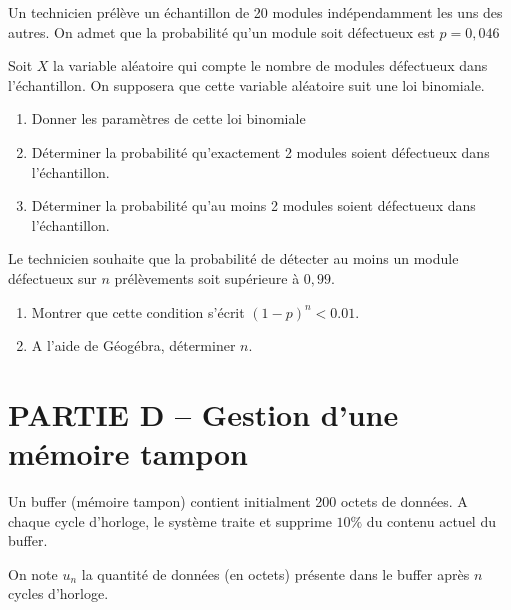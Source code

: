 Un technicien prélève un échantillon de 20 modules indépendamment les uns des autres. On admet que la probabilité qu’un module soit défectueux est $p=0,046$

Soit $X$ la variable aléatoire qui compte le nombre de modules défectueux dans l’échantillon. On supposera que cette variable aléatoire suit une loi binomiale.

\begin{enumerate}[series=monDS, resume]
    \item Donner les paramètres de cette loi binomiale
    \begin{blocvisiblex}[height=2]
    {\quad}
    \end{blocvisiblex}
    \medskip
    \item Déterminer la probabilité qu'exactement 2 modules soient défectueux dans l'échantillon.
    \begin{blocvisiblex}[height=2]
    {\quad}
    \end{blocvisiblex}
    \medskip
    \item Déterminer la probabilité qu'au moins 2 modules soient défectueux dans l'échantillon.
    \begin{blocvisiblex}[height=2]
    {\quad}
    \end{blocvisiblex}
\end{enumerate}


Le technicien souhaite que la probabilité de détecter au moins un module défectueux sur $n$ prélèvements soit supérieure à $0,99$.

\begin{enumerate}[series=monDS, resume]
    \item Montrer que cette condition s'écrit ${(1-p)}^n < 0.01$.
    \item A l'aide de Géogébra, déterminer $n$.
    \appelprof{}
\end{enumerate}

\section*{PARTIE D -- Gestion d'une mémoire tampon}

Un buffer (mémoire tampon) contient initialment 200 octets de données. A chaque cycle d'horloge, le système traite et supprime $10\%$ du contenu actuel du buffer.

On note $u_n$ la quantité de données (en octets) présente dans le buffer après $n$ cycles d'horloge.

